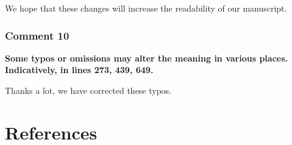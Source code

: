 \documentclass[
]{article}
\begin{document}
We hope that these changes will increase the readability of our
manuscript.

\hypertarget{comment-10}{%
\subsubsection{Comment 10}\label{comment-10}}

\textbf{Some typos or omissions may alter the meaning in various places.
Indicatively, in lines 273, 439, 649.}

Thanks a lot, we have corrected these typos.

\newpage

\hypertarget{references}{%
\section*{References}\label{references}}
\end{document}
